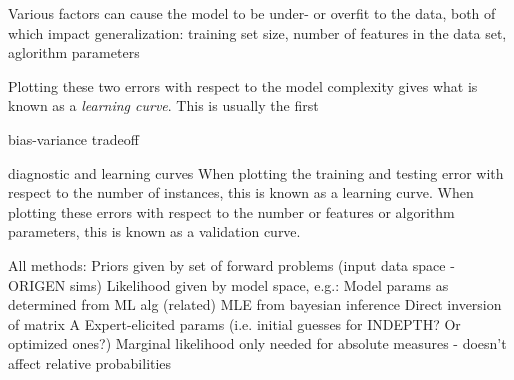 Various
factors can cause the model to be under- or overfit to the data, both of which
impact generalization: training set size, number of features in the data set,
aglorithm parameters


Plotting these two errors with respect to the model complexity gives what is known as 
a \textit{learning curve}. This is usually the first

bias-variance tradeoff

diagnostic and learning curves
When plotting the training and testing error
with respect to the number of instances, this is known as a learning curve.
When plotting these errors with respect to the number or features or algorithm
parameters, this is known as a validation curve. 

All methods:
Priors given by set of forward problems (input data space - ORIGEN sims)
Likelihood given by model space, e.g.: 
Model params as determined from ML alg
(related) MLE from bayesian inference
Direct inversion of matrix A
Expert-elicited params (i.e. initial guesses for INDEPTH? Or optimized ones?)
Marginal likelihood only needed for absolute measures - doesn’t affect relative probabilities

